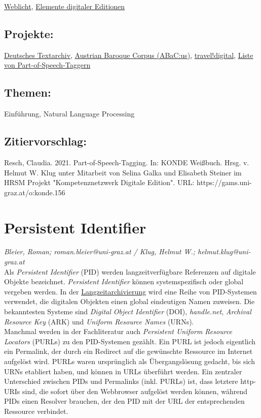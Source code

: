 \documentclass{article}
\begin{document}
\href{https://gams.uni-graz.at/o:konde.212}{Weblicht}, \href{https://gams.uni-graz.at/o:konde.80}{Elemente digitaler Editionen}\subsection*{Projekte:}\href{http://www.deutschestextarchiv.de/}{Deutsches Textarchiv}, \href{https://acdh.oeaw.ac.at/abacus/}{Austrian Baroque Corpus (ABaC:us)}, \href{https://traveldigital.acdh.oeaw.ac.at/}{travel!digital}, \href{https://nlp.stanford.edu/links/statnlp.html#Taggers}{Liste von Part-of-Speech-Taggern}\subsection*{Themen:}Einführung, Natural Language Processing\subsection*{Zitiervorschlag:}Resch, Claudia. 2021. Part-of-Speech-Tagging. In: KONDE Weißbuch. Hrsg. v. Helmut W. Klug unter Mitarbeit von Selina Galka und Elisabeth Steiner im HRSM Projekt "Kompetenznetzwerk Digitale Edition". URL: https://gams.uni-graz.at/o:konde.156\newpage\section*{Persistent Identifier} \emph{Bleier, Roman; roman.bleier@uni-graz.at / Klug, Helmut W.; helmut.klug@uni-graz.at }\\
        
    Als \emph{Persistent Identifier} (PID) werden langzeitverfügbare Referenzen auf digitale Objekte bezeichnet. \emph{Persistent Identifier} können systemspezifisch oder global vergeben werden. In der \href{http://gams.uni-graz.at/o:konde.6}{Langzeitarchivierung} wird eine Reihe von PID-Systemen verwendet, die digitalen Objekten einen global eindeutigen Namen zuweisen. Die bekanntesten Systeme sind \emph{Digital Object Identifier} (DOI), \emph{handle.net}, \emph{Archival Resource Key} (ARK) und \emph{Uniform Resource Names} (URNs). \\
            
        Manchmal werden in der Fachliteratur auch \emph{Persistent Uniform Resource Locators} (PURLs) zu den PID-Systemen gezählt. Ein PURL ist jedoch eigentlich ein Permalink, der durch ein Redirect auf die gewünschte Ressource im Internet aufgelöst wird. PURLs waren ursprünglich als Übergangslösung gedacht, bis sich URNs etabliert haben, und können in URLs überführt werden. Ein zentraler Unterschied zwischen PIDs und Permalinks (inkl. PURLs) ist, dass letztere http-URIs sind, die sofort über den Webbrowser aufgelöst werden können, während PIDs einen Resolver brauchen, der den PID mit der URL der entsprechenden Ressource verbindet.\\
            
\end{document}
